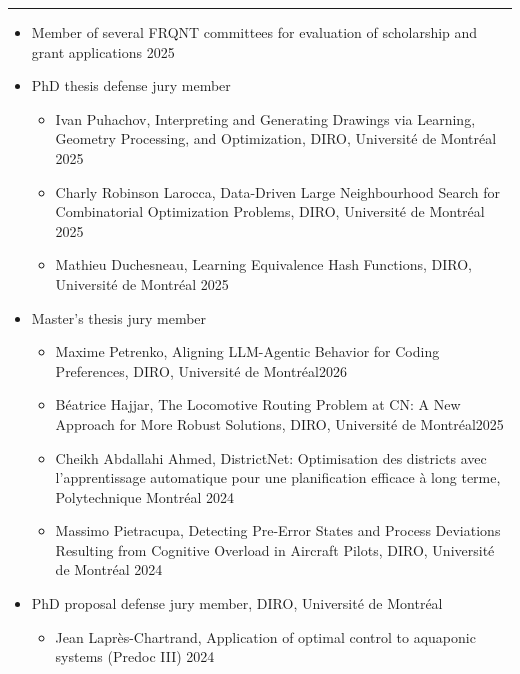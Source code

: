 \documentclass[12pt]{article}
\renewcommand{\section}[1]{
\vspace{0.25em}
\noindent{\normalfont\large\bfseries\color{black} #1}\par
\vspace{-0.24em}
\noindent\textcolor{black}{\rule{0.55\textwidth}{1.1pt}}
\vspace{0.48em}
}
\newenvironment{midlist}[1][\enskip\textbullet]%
        {\begin{itemize}[#1,leftmargin=*,parsep=0pt,itemsep=4pt,topsep=2pt,partopsep=0pt]}
        {\end{itemize}}
\begin{document}
\section{Academic Service}
\vspace{-3mm}
\begin{midlist}
\item Member of several FRQNT committees for evaluation of scholarship and grant applications \hfill{2025}
\item PhD thesis defense jury member
\vspace{1mm}
\begin{midlist}
\item Ivan Puhachov,  Interpreting and Generating Drawings via Learning, Geometry Processing, and
Optimization, DIRO, Université de Montréal \hfill{2025}
\item Charly Robinson Larocca, Data-Driven Large Neighbourhood Search for Combinatorial
Optimization Problems, DIRO, Université de Montréal \hfill{2025}
\item Mathieu Duchesneau, Learning Equivalence Hash Functions, DIRO, Université de Montréal \hfill{2025}
\end{midlist}
\item Master's thesis  jury member
\vspace{1mm}
\begin{midlist}
\item Maxime Petrenko, Aligning LLM-Agentic Behavior for Coding Preferences, DIRO, Université de Montréal\hfill{2026}
\item Béatrice Hajjar, The Locomotive Routing Problem at CN: A New Approach for More Robust Solutions, DIRO, Université de Montréal\hfill{2025}
\item Cheikh Abdallahi Ahmed, DistrictNet: Optimisation des districts avec l’apprentissage automatique pour
une planification efficace à long terme,  Polytechnique Montréal \hfill{2024}
\item Massimo Pietracupa, Detecting Pre-Error States and Process Deviations Resulting from Cognitive Overload in Aircraft Pilots, DIRO, Université de Montréal \hfill{2024}
\end{midlist}
\item PhD proposal defense jury member, DIRO, Université de Montréal 
\vspace{1mm}
\begin{midlist}
\item Jean Laprès-Chartrand, Application of optimal control to aquaponic systems (Predoc III) 
 \hfill{2024}

\end{midlist}
\end{midlist}
\end{document}
